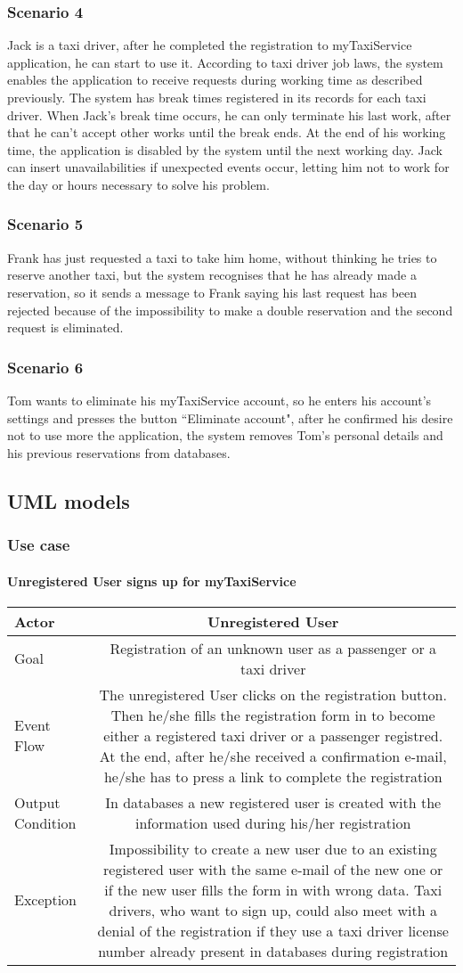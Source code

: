 \documentclass[a4paper,12pt]{article}%
\newcommand{\usecasetable}[5]{
\begin{center}
\begin{tabularx}{\textwidth}{|X|C|}
\hline
Actor & #1\\
\hline
Goal & #2\\
\hline
Event Flow & #3\\
\hline
Output Condition & #4\\
\hline
Exception & #5\\
\hline
\end{tabularx}
\end{center}
}
\begin{document}
\subsubsection{Scenario 4} 
Jack is a taxi driver, after he completed the registration to myTaxiService application, he can start to use it. According to taxi driver job laws, the system enables the application to receive requests during working time as described previously. The system has break times registered in its records for each taxi driver. When Jack's break time occurs, he can only terminate his last work, after that he can't accept other works until the break ends. At the end of his working time, the application is disabled by the system until the next working day. Jack can insert unavailabilities if unexpected events occur, letting him not to work for the day or hours necessary to solve his problem. 
\subsubsection{Scenario 5}
Frank has just requested a taxi to take him home, without thinking he tries to reserve another taxi, but the system recognises that he has already made a reservation, so it sends a message to Frank saying his last request has been rejected because of the impossibility to make a double reservation and the second request is eliminated.
\subsubsection{Scenario 6}  
Tom wants to eliminate his myTaxiService account, so he enters his account's settings and presses the button ``Eliminate account", after he confirmed his desire not to use more the application, the system removes Tom's personal details and his previous reservations from databases.

\pagebreak
\subsection{UML models}
\subsubsection{Use case} 
\paragraph{Unregistered User signs up for myTaxiService}
\usecasetable {Unregistered User} {Registration of an unknown user as a passenger or a taxi driver} {The unregistered User clicks on the registration button. Then he/she fills the registration form in to become either a registered taxi driver or a passenger registred. At the end, after he/she received a confirmation e-mail, he/she has to press a link to complete the registration} {In databases a new registered user is created with the information used during his/her registration} {Impossibility to create a new user due to an existing registered user with the same e-mail of the new one or if the new user fills the form in with wrong data. Taxi drivers, who want to sign up, could also meet with a denial of the registration if they use a taxi driver license number already present in databases during registration}
\end{document}
